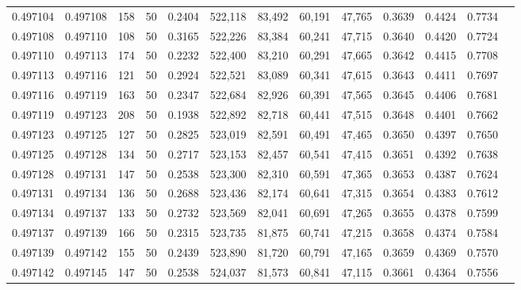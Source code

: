 \begin{tabular}{rrrrrrrrrrrrr}
0.497104 & 0.497108 &   158 &  50 &                                     0.2404 & 522,118 &  83,492 &  60,191 &  47,765 & 0.3639 & 0.4424 & 0.7734 \\
0.497108 & 0.497110 &   108 &  50 &                                     0.3165 & 522,226 &  83,384 &  60,241 &  47,715 & 0.3640 & 0.4420 & 0.7724 \\
0.497110 & 0.497113 &   174 &  50 &                                     0.2232 & 522,400 &  83,210 &  60,291 &  47,665 & 0.3642 & 0.4415 & 0.7708 \\
0.497113 & 0.497116 &   121 &  50 &                                     0.2924 & 522,521 &  83,089 &  60,341 &  47,615 & 0.3643 & 0.4411 & 0.7697 \\
0.497116 & 0.497119 &   163 &  50 &                                     0.2347 & 522,684 &  82,926 &  60,391 &  47,565 & 0.3645 & 0.4406 & 0.7681 \\
0.497119 & 0.497123 &   208 &  50 &                                     0.1938 & 522,892 &  82,718 &  60,441 &  47,515 & 0.3648 & 0.4401 & 0.7662 \\
0.497123 & 0.497125 &   127 &  50 &                                     0.2825 & 523,019 &  82,591 &  60,491 &  47,465 & 0.3650 & 0.4397 & 0.7650 \\
0.497125 & 0.497128 &   134 &  50 &                                     0.2717 & 523,153 &  82,457 &  60,541 &  47,415 & 0.3651 & 0.4392 & 0.7638 \\
0.497128 & 0.497131 &   147 &  50 &                                     0.2538 & 523,300 &  82,310 &  60,591 &  47,365 & 0.3653 & 0.4387 & 0.7624 \\
0.497131 & 0.497134 &   136 &  50 &                                     0.2688 & 523,436 &  82,174 &  60,641 &  47,315 & 0.3654 & 0.4383 & 0.7612 \\
0.497134 & 0.497137 &   133 &  50 &                                     0.2732 & 523,569 &  82,041 &  60,691 &  47,265 & 0.3655 & 0.4378 & 0.7599 \\
0.497137 & 0.497139 &   166 &  50 &                                     0.2315 & 523,735 &  81,875 &  60,741 &  47,215 & 0.3658 & 0.4374 & 0.7584 \\
0.497139 & 0.497142 &   155 &  50 &                                     0.2439 & 523,890 &  81,720 &  60,791 &  47,165 & 0.3659 & 0.4369 & 0.7570 \\
0.497142 & 0.497145 &   147 &  50 &                                     0.2538 & 524,037 &  81,573 &  60,841 &  47,115 & 0.3661 & 0.4364 & 0.7556 \\

\end{tabular}

